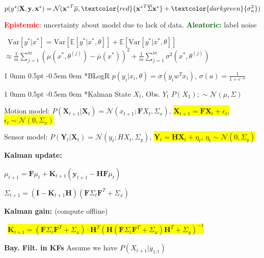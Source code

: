 \documentclass[11pt,landscape,a4paper,fleqn]{article}
\makeatletter
\let\bar\overline
\newcommand*{\rsection}{%
	\@startsection{section}%
	{1}%
	{0mm}%
	{0.5pt}%
	{-0.5em \@plus 0em}
	{\color{myorange}\sffamily\small\bfseries}}
\newcommand{\mhl}[1]{\setlength{\fboxsep}{0pt}\colorbox{yellow}{#1}}
\makeatother
\begin{document}
\begin{multicols*}{4}
	$p(y^* | \mathbf{X,y,x^*}) = \mathcal{N}({\mathbf{x}^*}^T \overline{\mu}, \textcolor{red}{{\mathbf{x}^*}^T \overline{\Sigma} \mathbf{x}^*} + \textcolor{darkgreen}{\sigma_n^2})$

		\textcolor{red}{\textbf{Epistemic}}: uncertainty about model due to lack of data. \textcolor{darkgreen}{\textbf{Aleatoric:}} label noise

		\mbox{\fontsize{10}{6}\selectfont
			$\text{Var} \left[y^*| x^* \right] =
				\text{Var} \left[\mathbb{E}\left[ y^* | x^*, \theta \right] \right]
				+ \mathbb{E}\left[ \text{Var}\left[y^* | x^*, \theta\right]\right]$
		}
		\mbox{\fontsize{9.5}{6}\selectfont
	$\approx \frac{1}{m} \sum_{j =1}^m\left(\mu(x^*, \theta^{(j)})  - \bar{\mu}(x^*)\right)^2 +\frac{1}{m} \sum_{j=1}^m \sigma^2 (x^*, \theta^{(j)}) $}


		\rsection*{BLogR} $p(y_i | x_i, \theta) = \sigma(y_i w^T x_i)$, $\sigma(a) = \frac{1}{1 + e^{-a}}$

		\rsection*{Kalman}
		State $X_t$, Obs. $Y_t$ $P(X_1); \sim \mathcal{N}(\mu, \Sigma)$

		Motion model: $P(\mathbf{X}_{t+1} | \mathbf{X}_t) = \mathcal{N}(x_{t+1}; \mathbf{F} X_t, \Sigma_x)$, \mhl{$\mathbf{X}_{t+1} = \mathbf{F} \mathbf{X}_{t} + \epsilon_t$, $\epsilon_t \sim \mathcal{N}(0, \Sigma_x)$}

		Sensor model: $P(\mathbf{Y}_t | \mathbf{X}_t) = \mathcal{N}(y_t; H X_t, \Sigma_y)$, \mhl{$\mathbf{Y}_t = \mathbf{H} \mathbf{X}_t + \eta_t$, $\eta_t \sim \mathcal{N}(0, \Sigma_y)$}

		\textbf{Kalman update:}

	$\mu_{t+1} = \mathbf{F} \mu_t + \mathbf{K}_{t+1} (\mathbf{y}_{t+1} - \mathbf{H} \mathbf{F} \mu_t)$

	$\Sigma_{t+1} = (\mathbf{I} - \mathbf{K}_{t+1} \mathbf{H}) (\mathbf{F} \Sigma_t \mathbf{F}^T + \Sigma_x)$

		\textbf{Kalman gain:} (compute offline)

		\mbox{\fontsize{9.3}{6}\selectfont
			\mhl{$\mathbf{K}_{t+1} = ( \mathbf{F} \Sigma_t \mathbf{F}^T + \Sigma_x ) \cdot \mathbf{H}^T ( \mathbf{H} (\mathbf{F} \Sigma_t \mathbf{F}^T + \Sigma_x ) \mathbf{H}^T + \Sigma_y )^{-1}$}
		}


		\textbf{Bay. Filt. in KFs} Assume we have $P(X_{t+1} | y_{1:t})$


\end{multicols*}
\end{document}
